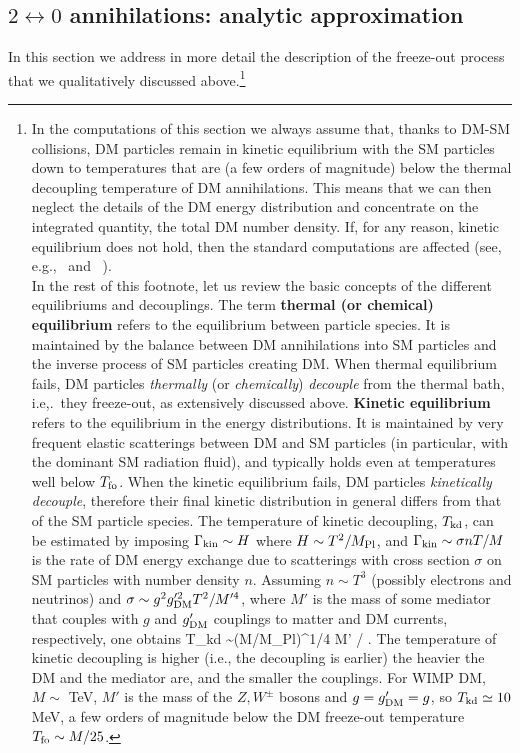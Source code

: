 \subsection{$2\leftrightarrow 0$ annihilations: analytic approximation}\label{analyticapprox}

In this section we address in more detail the description of the freeze-out process that we qualitatively discussed above.\footnote{
In the computations of this section we always assume that, thanks to DM-SM collisions, DM particles remain in kinetic equilibrium with the SM particles down to temperatures that are (a few orders of magnitude) below the thermal decoupling temperature of DM annihilations. This means that we can then neglect the details of the DM energy distribution and concentrate on the integrated quantity, the total DM number density. If, for any reason, kinetic equilibrium does not hold, then the standard computations are affected (see, e.g.,~ and ~\cite{KineticEquilibrium}). \\
In the rest of this footnote, let us review the basic concepts of the different equilibriums and decouplings. 
The term {\bf thermal (or chemical) equilibrium} refers to the equilibrium between particle species. It is maintained by the balance between DM annihilations into SM particles and the inverse process of SM particles creating DM. 
When thermal equilibrium fails, DM particles {\em thermally} (or {\em chemically}) {\em decouple} from the thermal bath, i.e,.~they freeze-out, as extensively discussed above. 
{\bf Kinetic equilibrium}~\cite{KineticEquilibrium} refers to the equilibrium in the energy distributions. It is maintained by very frequent elastic scatterings between DM and SM particles (in particular, with the dominant SM radiation fluid), and typically holds even at temperatures well below $T_{\rm fo}$. When the kinetic equilibrium fails, DM particles {\em kinetically decouple}, therefore their final kinetic distribution in general differs from that of the SM particle species. 
The temperature of kinetic decoupling, $T_{\rm kd}$,  can be estimated by imposing 
$\Gamma_{\rm kin} \sim H$ where $H \sim T^2/M_{\rm Pl}$, and
$\Gamma_{\rm kin} \sim \sigma n T/M$ is the rate of DM energy exchange due to scatterings with cross section $\sigma$
on SM particles with number density $n$.
Assuming $n \sim T^3$ (possibly electrons and neutrinos) and $\sigma \sim g^2 g'^2_{\rm DM}T^2/M'^4$, 
where $M'$ is the mass of some mediator that couples with $g$ and $g'_{\rm DM}$ couplings to matter and DM currents, respectively, one obtains  
\beq T_{\rm kd} \sim (M/M_{\rm Pl})^{1/4} M' / .\label{eq:Tkindec}\eeq
The temperature of kinetic decoupling is higher (i.e., the decoupling is earlier) the heavier the DM and the mediator are, and the smaller the couplings. For WIMP DM, $M \sim$ TeV, $M'$ is the mass of the $Z,W^\pm$ bosons and $g = g'_{\rm DM} =g$, so $T_{\rm kd} \simeq 10$ MeV, 
a few orders of magnitude below the DM freeze-out temperature $T_{\rm fo} \sim M/25$.}

